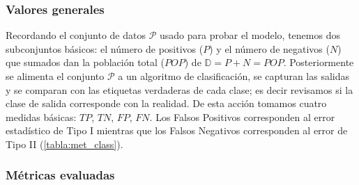 \subsubsection{Valores generales}

Recordando el conjunto de datos $\mathcal{P}$ usado para probar el modelo,
tenemos dos subconjuntos básicos: el número de positivos ($P$) y el número de
negativos ($N$) que sumados dan la población total ($POP$) de $ \mathbb{D} = P
+ N = POP$. Posteriormente se alimenta el conjunto $\mathcal{P}$ a un algoritmo
de clasificación, se capturan las salidas y se comparan con las etiquetas
verdaderas de cada clase; es decir revisamos si la clase de salida corresponde
con la realidad. De esta acción tomamos cuatro medidas básicas: $TP$, $TN$,
$FP$, $FN$. Los Falsos Positivos corresponden al error estadístico de Tipo I
mientras que los Falsos Negativos corresponden al error de Tipo II
(\autoref{tabla:met_class}).

\begin{table}[H]
    \centering
    \caption{Valores generales de un problema de clasificación}\label{tabla:met_class}
    \end{table}

\subsubsection{Métricas evaluadas}

